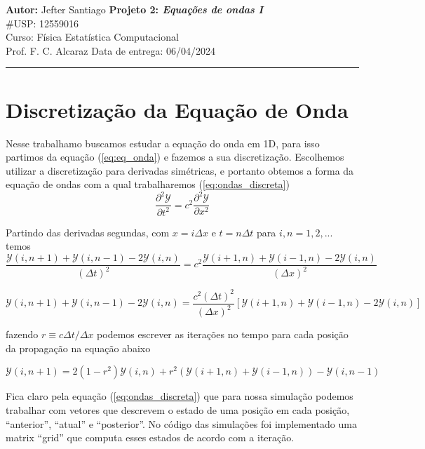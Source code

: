 \documentclass[a4paper, 11pt]{article}
\begin{document}
\noindent
\large\textbf{Autor:} Jefter Santiago \hfill \textbf{Projeto 2: {\color{blue}\emph{Equações de ondas I}}}   \\
\#USP: 12559016 \\
\normalsize Curso: Física Estatística Computacional \\
Prof. F. C. Alcaraz \hfill Data de entrega: 06/04/2024\\
\noindent\rule{7in}{2.8pt}


\section{Discretização da Equação de Onda}
Nesse trabalhamo buscamos estudar a equação do onda em 1D, para isso partimos da equação
(\ref{eq:eq_onda}) e fazemos a sua discretização. Escolhemos utilizar a discretização para derivadas
simétricas, e portanto obtemos a forma da equação de ondas com a qual trabalharemos (\ref{eq:ondas_discreta})
\begin{equation}
  \frac{\partial^2 \mathcal{Y}}{\partial t^2} = c^2  \frac{\partial^2 \mathcal{Y}}{\partial x^2}
  \label{eq:eq_onda}
\end{equation}

Partindo das derivadas segundas, com \( x = i \Delta x \) e \( t = n \Delta t \) para \( i, n = 1, 2, ... \)  temos
\[  \frac{\mathcal{Y}(i, n+1) + \mathcal{Y}(i,n-1) - 2 \mathcal{Y}(i,n)}{(\Delta t)^2} = c^2 \frac{\mathcal{Y}(i+1,n) + \mathcal{Y}(i-1,n) -
    2\mathcal{Y}(i,n)}{(\Delta x)^2} \]

\[ \mathcal{Y}(i, n+1) + \mathcal{Y}(i,n-1) - 2 \mathcal{Y}(i,n) = \frac{c^2 (\Delta t)^2}{(\Delta x)^2} \left[ \mathcal{Y}(i+1, n) + \mathcal{Y}(i-1,n) - 2\mathcal{Y}(i,n) \right]  \]

fazendo  \( r \equiv  c \Delta t/\Delta x\) podemos escrever as iterações no tempo para cada posição da propagação
na equação abaixo

\begin{equation}
  \mathcal{Y}(i, n+1) = 2 \left( 1 - r^2 \right) \mathcal{Y}(i, n) + r^2 \left( \mathcal{Y}(i+1,n) + \mathcal{Y}(i-1,n) \right) - \mathcal{Y}(i,n-1)
  \label{eq:ondas_discreta}
\end{equation}


Fica claro pela equação (\ref{eq:ondas_discreta}) que para nossa simulação podemos trabalhar com 
vetores que descrevem o estado de uma posição em cada posição, ``anterior'', ``atual'' e
``posterior''. No código das simulações foi implementado uma matrix ``grid'' que computa esses
estados de acordo com a iteração.  
\end{document}
